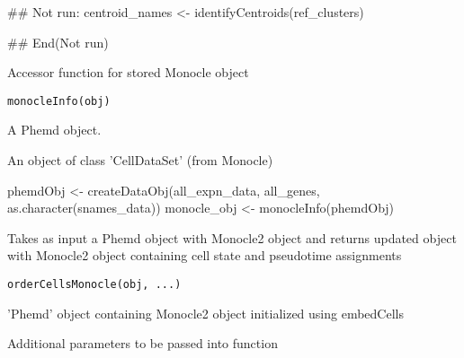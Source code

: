 \documentclass[a4paper]{book}
\begin{document}
%
\begin{Examples}
\begin{ExampleCode}
## Not run: 
centroid_names <- identifyCentroids(ref_clusters)

## End(Not run)
\end{ExampleCode}
\end{Examples}
%
\begin{Description}\relax
Accessor function for stored Monocle object
\end{Description}
%
\begin{Usage}
\begin{verbatim}
monocleInfo(obj)
\end{verbatim}
\end{Usage}
%
\begin{Arguments}
\begin{ldescription}
\item[\code{obj}] A Phemd object.
\end{ldescription}
\end{Arguments}
%
\begin{Value}
An object of class 'CellDataSet' (from Monocle)
\end{Value}
%
\begin{Examples}
\begin{ExampleCode}
phemdObj <- createDataObj(all_expn_data, all_genes, as.character(snames_data))
monocle_obj <- monocleInfo(phemdObj)

\end{ExampleCode}
\end{Examples}
%
\begin{Description}\relax
Takes as input a Phemd object with Monocle2 object and returns updated object with Monocle2 object containing cell state and pseudotime assignments
\end{Description}
%
\begin{Usage}
\begin{verbatim}
orderCellsMonocle(obj, ...)
\end{verbatim}
\end{Usage}
%
\begin{Arguments}
\begin{ldescription}
\item[\code{obj}] 'Phemd' object containing Monocle2 object initialized using embedCells

\item[\code{...}] Additional parameters to be passed into  function
\end{ldescription}
\end{Arguments}
\end{document}
